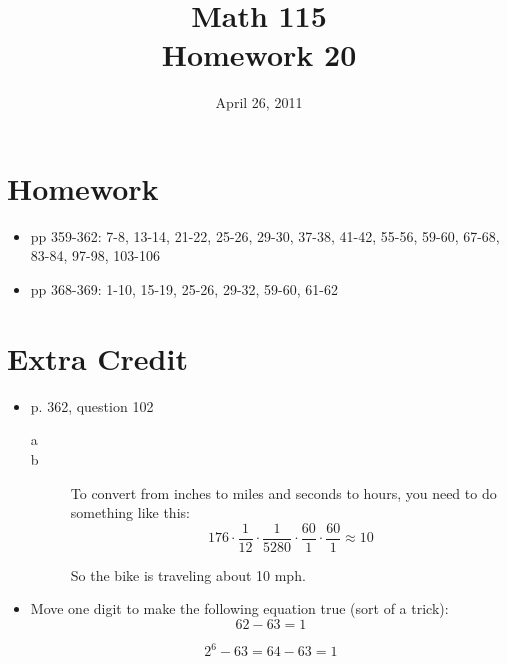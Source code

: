 \documentclass[fleqn,addpoints]{exam}
\title{Math 115 \\ Homework 20}
\date{April 26, 2011}
\begin{document}
\maketitle


\section{Homework}
\begin{itemize}
  \item pp 359-362: 7-8, 13-14, 21-22, 25-26, 29-30, 37-38, 41-42, 55-56, 59-60, 67-68, 83-84, 97-98, 103-106
  \item pp 368-369: 1-10, 15-19, 25-26, 29-32, 59-60, 61-62
\end{itemize}

\section{Extra Credit}

\begin{itemize}
\item p. 362, question 102

\begin{solution}
\begin{description}
\item[a]


\item[b]

To convert from inches to miles and seconds to hours, you need to do something like this:
\[
  176 \cdot \frac{1}{12} \cdot \frac{1}{5280} \cdot \frac{60}{1} \cdot \frac{60}{1} \approx 10
\]

So the bike is traveling about 10 mph.

\end{description}

\end{solution}

\item 
Move one digit to make the following equation true (sort of a trick):
\[
  62 - 63 = 1
\] 
\begin{solution}
\[
  2^6 - 63 = 64 - 63 = 1
\] 
\end{solution}

\end{itemize}
\end{document}
